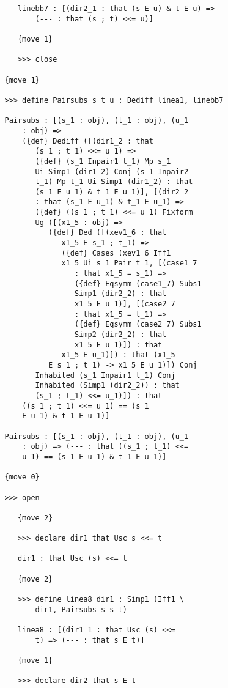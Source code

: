\documentclass[12pt]{article}
\begin{document}
\begin{verbatim}
      linebb7 : [(dir2_1 : that (s E u) & t E u) => 
          (--- : that (s ; t) <<= u)]

      {move 1}

      >>> close

   {move 1}

   >>> define Pairsubs s t u : Dediff linea1, linebb7

   Pairsubs : [(s_1 : obj), (t_1 : obj), (u_1 
       : obj) => 
       ({def} Dediff ([(dir1_2 : that 
          (s_1 ; t_1) <<= u_1) => 
          ({def} (s_1 Inpair1 t_1) Mp s_1 
          Ui Simp1 (dir1_2) Conj (s_1 Inpair2 
          t_1) Mp t_1 Ui Simp1 (dir1_2) : that 
          (s_1 E u_1) & t_1 E u_1)], [(dir2_2 
          : that (s_1 E u_1) & t_1 E u_1) => 
          ({def} ((s_1 ; t_1) <<= u_1) Fixform 
          Ug ([(x1_5 : obj) => 
             ({def} Ded ([(xev1_6 : that 
                x1_5 E s_1 ; t_1) => 
                ({def} Cases (xev1_6 Iff1 
                x1_5 Ui s_1 Pair t_1, [(case1_7 
                   : that x1_5 = s_1) => 
                   ({def} Eqsymm (case1_7) Subs1 
                   Simp1 (dir2_2) : that 
                   x1_5 E u_1)], [(case2_7 
                   : that x1_5 = t_1) => 
                   ({def} Eqsymm (case2_7) Subs1 
                   Simp2 (dir2_2) : that 
                   x1_5 E u_1)]) : that 
                x1_5 E u_1)]) : that (x1_5 
             E s_1 ; t_1) -> x1_5 E u_1)]) Conj 
          Inhabited (s_1 Inpair1 t_1) Conj 
          Inhabited (Simp1 (dir2_2)) : that 
          (s_1 ; t_1) <<= u_1)]) : that 
       ((s_1 ; t_1) <<= u_1) == (s_1 
       E u_1) & t_1 E u_1)]

   Pairsubs : [(s_1 : obj), (t_1 : obj), (u_1 
       : obj) => (--- : that ((s_1 ; t_1) <<= 
       u_1) == (s_1 E u_1) & t_1 E u_1)]

   {move 0}

   >>> open

      {move 2}

      >>> declare dir1 that Usc s <<= t

      dir1 : that Usc (s) <<= t

      {move 2}

      >>> define linea8 dir1 : Simp1 (Iff1 \
          dir1, Pairsubs s s t)

      linea8 : [(dir1_1 : that Usc (s) <<= 
          t) => (--- : that s E t)]

      {move 1}

      >>> declare dir2 that s E t


\end{verbatim}
\end{document}
